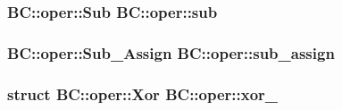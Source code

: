 \subsubsection[{\texorpdfstring{sub}{sub}}]{\setlength{\rightskip}{0pt plus 5cm} {\bf B\+C\+::oper\+::\+Sub}  B\+C\+::oper\+::sub}\hypertarget{namespaceBC_1_1oper_a66bc482a0e886673336e8fb49ec1d882}{}\label{namespaceBC_1_1oper_a66bc482a0e886673336e8fb49ec1d882}
\subsubsection[{\texorpdfstring{sub\+\_\+assign}{sub_assign}}]{\setlength{\rightskip}{0pt plus 5cm} {\bf B\+C\+::oper\+::\+Sub\+\_\+\+Assign}  B\+C\+::oper\+::sub\+\_\+assign}\hypertarget{namespaceBC_1_1oper_a75786bbf0065b4f36759ee9e4c3abd4b}{}\label{namespaceBC_1_1oper_a75786bbf0065b4f36759ee9e4c3abd4b}
\subsubsection[{\texorpdfstring{xor\+\_\+}{xor_}}]{\setlength{\rightskip}{0pt plus 5cm}struct {\bf B\+C\+::oper\+::\+Xor}  B\+C\+::oper\+::xor\+\_\+}\hypertarget{namespaceBC_1_1oper_ab035884cdae6f86f0c3823fe8aef7f1f}{}\label{namespaceBC_1_1oper_ab035884cdae6f86f0c3823fe8aef7f1f}

